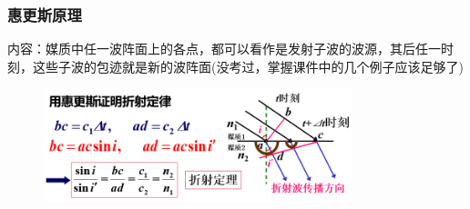 \documentclass[UTF8]{ctexbeamer}
\begin{document}
\begin{frame}
\frametitle{惠更斯原理}
内容：媒质中任一波阵面上的各点，都可以看作是发射子波的波源，其后任一时刻，这些子波的包迹就是新的波阵面(没考过，掌握课件中的几个例子应该足够了)
\begin{examples}
	\begin{figure}[!ht]
		\centering
		\includegraphics[width=0.8\textwidth]{5}
	\end{figure}
\end{examples}
\end{frame}
\end{document}
